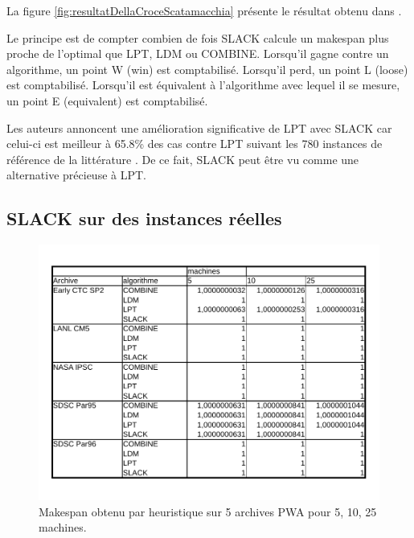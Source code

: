 \documentclass[a4paper,12pt]{report}
\theoremstyle{plain}				%
\theoremstyle{definition}				%
\newcommand{\jb}[1]{\todo[author=JB,color=orange,inline]{#1}}
\begin{document}
La figure \ref{fig:resultatDellaCroceScatamacchia} présente le résultat obtenu dans \cite{della2020longest}.

Le principe est de compter combien de fois SLACK calcule un makespan plus proche de l'optimal que LPT, LDM ou COMBINE.
Lorsqu'il gagne contre un algorithme, un point W (win) est comptabilisé. 
Lorsqu'il perd, un point L (loose) est comptabilisé.
Lorsqu'il est équivalent à l'algorithme avec lequel il se mesure, un point E (equivalent) est comptabilisé.   
 
Les auteurs annoncent une amélioration significative de LPT avec SLACK 
  car celui-ci est meilleur à 65.8\% des cas contre LPT suivant les 780 instances 
  de référence de la littérature \cite{della2020longest}. 
De ce fait, SLACK peut être vu comme une alternative précieuse à LPT.
  
  
\subsection{SLACK sur des instances réelles}
\label{ssec:resultatsSLACKReel}

\begin{figure}
{\centering
\includegraphics[width=\columnwidth]{2_Resultat_reel.pdf}
\caption{Makespan obtenu par heuristique sur 5 archives PWA pour 5, 10, 25 machines.}
\label{fig:resultat5PWA}
\par}
\end{figure}
 
\end{document}
